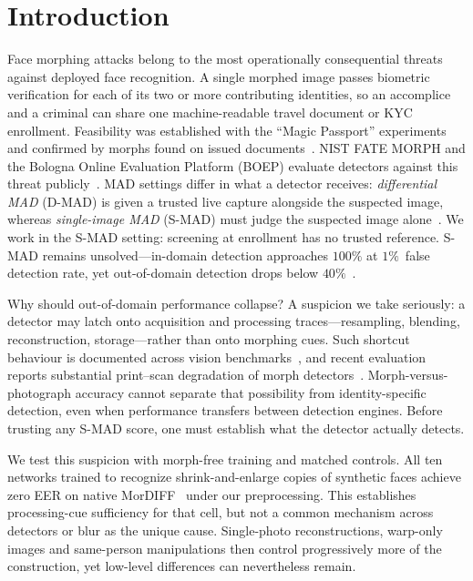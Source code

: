 \documentclass[10pt,twocolumn,letterpaper]{article}
\begin{document}
\section{Introduction}
Face morphing attacks belong to the most operationally consequential threats against deployed face recognition. A single morphed image passes biometric verification for each of its two or more contributing identities, so an accomplice and a criminal can share one machine-readable travel document or KYC enrollment. Feasibility was established with the ``Magic Passport'' experiments~\cite{ferrara2014magic} and confirmed by morphs found on issued documents~\cite{peng2018mogherini}. NIST FATE MORPH and the Bologna Online Evaluation Platform (BOEP) evaluate detectors against this threat publicly~\cite{nistir8584,boep}. MAD settings differ in what a detector receives: \emph{differential MAD} (D-MAD) is given a trusted live capture alongside the suspected image, whereas \emph{single-image MAD} (S-MAD) must judge the suspected image alone~\cite{venkatesh2021survey,scherhag2020deep}. We work in the S-MAD setting: screening at enrollment has no trusted reference. S-MAD remains unsolved---in-domain detection approaches $100\%$ at $1\%$~false detection rate, yet out-of-domain detection drops below $40\%$~\cite{ngan2025fatemorph}.

Why should out-of-domain performance collapse? A suspicion we take seriously: a detector may latch onto acquisition and processing traces---resampling, blending, reconstruction, storage---rather than onto morphing cues. Such shortcut behaviour is documented across vision benchmarks~\cite{geirhos2020shortcut}, and recent evaluation reports substantial print--scan degradation of morph detectors~\cite{paulo2026printed}. Morph-versus-photograph accuracy cannot separate that possibility from identity-specific detection, even when performance transfers between detection engines. Before trusting any S-MAD score, one must establish what the detector actually detects.

We test this suspicion with morph-free training and matched controls. All ten networks trained to recognize shrink-and-enlarge copies of synthetic faces achieve zero EER on native MorDIFF~\cite{damer2023mordiff} under our preprocessing. This establishes processing-cue sufficiency for that cell, but not a common mechanism across detectors or blur as the unique cause. Single-photo reconstructions, warp-only images and same-person manipulations then control progressively more of the construction, yet low-level differences can nevertheless remain.
\end{document}

